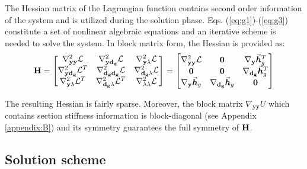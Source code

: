 The Hessian matrix of the Lagrangian function contains second order
information of the system and is utilized during the solution phase.
Eqs. (\ref{eq:g1})-(\ref{eq:g3}) constitute a set of nonlinear algebraic
equations and an iterative scheme is needed to solve the system. In block
matrix form, the Hessian is provided as:
\begin{gather}
	\mathbf{H} = \begin{bmatrix}
		\nabla^2_{\mathbf{yy}}\mathcal{L} & \nabla^2_{\mathbf{y d_g}}\mathcal{L}
		&\nabla^2_{\mathbf{y\lambda}}\mathcal{L} \\
		\nabla^2_{\mathbf{y d_g}}\mathcal{L}^T  & 
		\nabla^2_{\mathbf{d_gd_g}}\mathcal{L} &
		\nabla^2_{\mathbf{d_g\lambda}}\mathcal{L}\\
		\nabla^2_{\mathbf{y\lambda}}\mathcal{L}^T
		&\nabla^2_{\mathbf{d_g\lambda}}\mathcal{L}^T
		&\nabla^2_{\mathbf{\lambda\lambda}}\mathcal{L}
	\end{bmatrix} = \begin{bmatrix}
		\nabla^2_{\mathbf{yy}}\mathcal{L} & \mathbf{0} & 
		\nabla_{\mathbf{y}}\vec{\boldsymbol{h}}^T_g\\
		\mathbf{0} & \mathbf{0} & \nabla_{\mathbf{d_g}}\vec{\boldsymbol{h}}^T_g\\
		\nabla_{\mathbf{y}}\vec{\boldsymbol{h}}_g & \nabla_{\mathbf{d_g}}\vec{\boldsymbol{h}}_g & 
		\mathbf{0}\\
	\end{bmatrix}
	\label{eq:hess}
\end{gather}

\noindent The resulting Hessian is fairly sparse. Moreover, the block
matrix $\nabla_{\mathbf{yy}}U$ which contains section stiffness information is
block-diagonal (see Appendix \ref{appendix:B}) and its
symmetry guarantees the full symmetry of $\mathbf{H}$.

\subsection{Solution scheme}\label{subsection:CH2-S4SS3}

